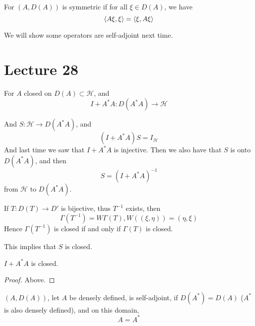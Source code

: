 \begin{definition}
    For $(A,D(A))$ is symmetric if for all $\xi\in D(A)$, we have
    \begin{equation*}
        \langle A\xi, \xi\rangle=\langle \xi, A\xi\rangle
    \end{equation*}
\end{definition}
We will show some operators are self-adjoint next time.


\section{Lecture 28}
For $A$ closed on $D(A)\subset\mathcal{H}$, and
\begin{equation*}
    I+A^*A: D(A^*A)\to\mathcal{H}
\end{equation*}

And $S: \mathcal{H}\to D(A^*A)$, and
\begin{equation*}
    (I+A^*A)S=I_\mathcal{H}
\end{equation*}
And last time we saw that $I+A^*A$ is injective. Then we also have that $S$ is onto $D(A^*A)$, and then
\begin{equation*}
    S=(I+A^*A)^{-1}
\end{equation*}
from $\mathcal{H}$ to $D(A^*A)$.
\begin{note}

If $T: D(T)\to D'$ is bijective, thus $T^{-1}$ exists, then
\begin{equation*}
    \Gamma(T^{-1})=W\Gamma(T), W((\xi,\eta))=(\eta, \xi)
\end{equation*}
Hence $\Gamma(T^{-1})$ is closed if and only if $\Gamma(T)$ is closed. 
\end{note}
This implies that $S$ is closed.
\begin{proposition}
    $I+A^*A$ is closed.
\end{proposition}
\begin{proof}
    Above.
\end{proof}

\begin{definition}
    $(A,D(A))$, let $A$ be densely defined, is self-adjoint, if $D(A^*)=D(A)$ ($A^*$ is also densely defined), and on this domain,
    \begin{equation*}
        A=A^*
    \end{equation*}
\end{definition}

